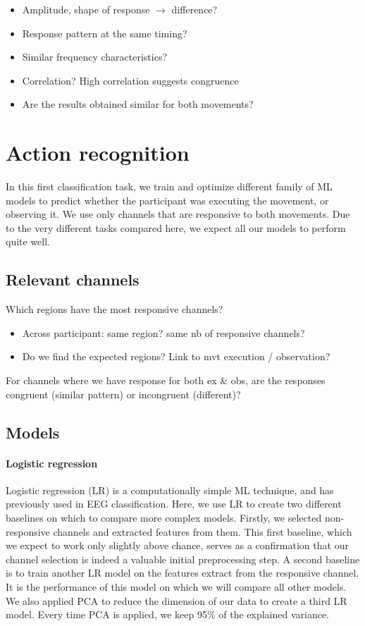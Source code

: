 \documentclass[10pt,conference,compsocconf]{IEEEtran}
\begin{document}
\begin{itemize}
    \item Amplitude, shape of response \(\to\) difference?
    \item Response pattern at the same timing?
    \item Similar frequency characteristics?
    \item Correlation? High correlation suggests congruence
    \item Are the results obtained similar for both movements?
\end{itemize}

\section{Action recognition}
\label{sec:actionrecognition}
In this first classification task, we train and optimize different family of ML models to predict whether the participant was executing the movement, or observing it. We use only channels that are responsive to both movements. Due to the very different tasks compared here, we expect all our models to perform quite well.

\subsection{Relevant channels}
Which regions have the most responsive channels?

\begin{itemize}
    \item Across participant: same region? same nb of responsive channels?
    \item Do we find the expected regions? Link to mvt execution / observation?
\end{itemize}

For channels where we have response for both ex \& obs, are the responses congruent (similar pattern) or incongruent (different)?

\subsection{Models}
\paragraph{Logistic regression}
Logistic regression (LR) is a computationally simple ML technique, and has previously used in EEG classification\cite{SUBASI200587, NIPS2006_35937e34}. Here, we use LR to create two different baselines on which to compare more complex models. Firstly, we selected non-responsive channels and extracted features from them. This first baseline, which we expect to work only slightly above chance, serves as a confirmation that our channel selection is indeed a valuable initial preprocessing step. A second baseline is to train another LR model on the features extract from the responsive channel. It is the performance of this model on which we will compare all other models. We also applied PCA to reduce the dimension of our data to create a third LR model. Every time PCA is applied, we keep 95\% of the explained variance.
\end{document}
